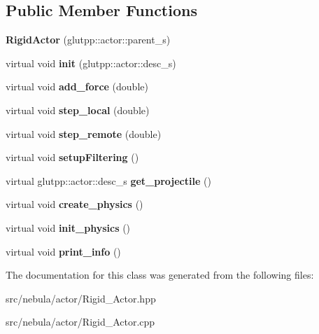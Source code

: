 \subsection*{Public Member Functions}
\begin{DoxyCompactItemize}
\item 
\hypertarget{classneb_1_1actor_1_1RigidActor_ac4ff1c2a8d278a0150b78eb8f0926242}{
{\bfseries RigidActor} (glutpp::actor::parent\_\-s)}
\label{classneb_1_1actor_1_1RigidActor_ac4ff1c2a8d278a0150b78eb8f0926242}

\item 
\hypertarget{classneb_1_1actor_1_1RigidActor_a14c131b0620a383c1bac6f31903bd2c6}{
virtual void {\bfseries init} (glutpp::actor::desc\_\-s)}
\label{classneb_1_1actor_1_1RigidActor_a14c131b0620a383c1bac6f31903bd2c6}

\item 
\hypertarget{classneb_1_1actor_1_1RigidActor_aba5d1f7c6c7da046207bbf934978076a}{
virtual void {\bfseries add\_\-force} (double)}
\label{classneb_1_1actor_1_1RigidActor_aba5d1f7c6c7da046207bbf934978076a}

\item 
\hypertarget{classneb_1_1actor_1_1RigidActor_ab387292054623de9ec9c5de26ad84d71}{
virtual void {\bfseries step\_\-local} (double)}
\label{classneb_1_1actor_1_1RigidActor_ab387292054623de9ec9c5de26ad84d71}

\item 
\hypertarget{classneb_1_1actor_1_1RigidActor_ab72bf9a60632e398f601b0f1adbf811e}{
virtual void {\bfseries step\_\-remote} (double)}
\label{classneb_1_1actor_1_1RigidActor_ab72bf9a60632e398f601b0f1adbf811e}

\item 
\hypertarget{classneb_1_1actor_1_1RigidActor_a0c859ee3609c13faf5f626b9aa6f67ab}{
virtual void {\bfseries setupFiltering} ()}
\label{classneb_1_1actor_1_1RigidActor_a0c859ee3609c13faf5f626b9aa6f67ab}

\item 
\hypertarget{classneb_1_1actor_1_1RigidActor_affb958ff8ac655c25906b0a9cd0f0bb5}{
virtual glutpp::actor::desc\_\-s {\bfseries get\_\-projectile} ()}
\label{classneb_1_1actor_1_1RigidActor_affb958ff8ac655c25906b0a9cd0f0bb5}

\item 
\hypertarget{classneb_1_1actor_1_1RigidActor_a03b2db7d5a6b25d3522480989e7eade9}{
virtual void {\bfseries create\_\-physics} ()}
\label{classneb_1_1actor_1_1RigidActor_a03b2db7d5a6b25d3522480989e7eade9}

\item 
\hypertarget{classneb_1_1actor_1_1RigidActor_aada9b32e93ae80559664459679e6489e}{
virtual void {\bfseries init\_\-physics} ()}
\label{classneb_1_1actor_1_1RigidActor_aada9b32e93ae80559664459679e6489e}

\item 
\hypertarget{classneb_1_1actor_1_1RigidActor_a8dd99df00071772dfd5227226105a16e}{
virtual void {\bfseries print\_\-info} ()}
\label{classneb_1_1actor_1_1RigidActor_a8dd99df00071772dfd5227226105a16e}

\end{DoxyCompactItemize}


The documentation for this class was generated from the following files:\begin{DoxyCompactItemize}
\item 
src/nebula/actor/Rigid\_\-Actor.hpp\item 
src/nebula/actor/Rigid\_\-Actor.cpp\end{DoxyCompactItemize}
